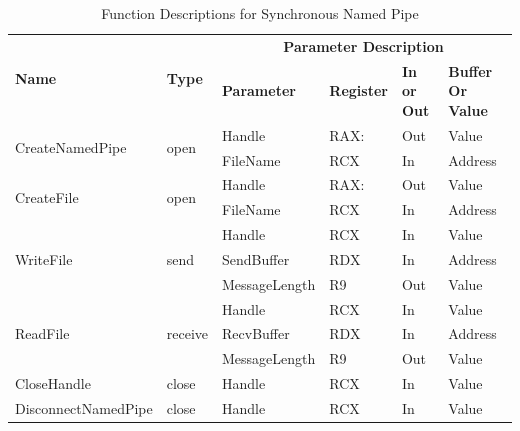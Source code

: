 \begin{table}[H]
  \centering
  \caption{Function Descriptions for Synchronous Named Pipe}
  \label{synfunctions}
  \begin{tabular}{|l|l|l|l|l|l|}
      \hline
       \multirow{2}{*}{{\textbf{Name}}} & \multirow{2}{*}{{\textbf{Type}}} & \multicolumn{4}{c|}{\textbf{Parameter Description}}  \\
        \cline{3-6} 
       & & \textbf{Parameter}& \textbf{Register}& \textbf{In or Out} &  \textbf{Buffer Or Value}  \\
       \hline
       \multirow{2}{*}{CreateNamedPipe}
       &\multirow{2}{*}{open} &  Handle & RAX: & Out & Value\\
        \cline{3-6} 
       & & FileName & RCX & In & Address\\
      \hline         
      \multirow{2}{*}{CreateFile}
       &\multirow{2}{*}{open} &  Handle & RAX: & Out & Value\\
        \cline{3-6} 
       & & FileName & RCX & In & Address\\
      \hline              
      \multirow{3}{*}{WriteFile}
       &\multirow{3}{*}{send} &  Handle & RCX & In & Value\\
        \cline{3-6} 
       & & SendBuffer & RDX & In & Address\\
        \cline{3-6} 
       & & MessageLength & R9 & Out & Value\\
      \hline            
      \multirow{3}{*}{ReadFile}
       &\multirow{3}{*}{receive} &  Handle & RCX & In & Value\\
        \cline{3-6} 
       & & RecvBuffer & RDX & In & Address\\
        \cline{3-6} 
       & & MessageLength & R9 & Out & Value\\
      \hline            
      CloseHandle &
       close &  Handle & RCX & In & Value\\
      \hline            
      DisconnectNamedPipe &
      close &  Handle & RCX & In & Value\\
      \hline               
  \end{tabular}
\end{table}


